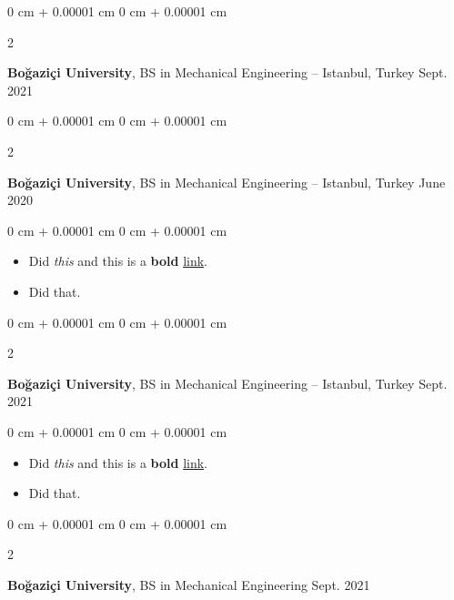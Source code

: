 \documentclass[10pt, letterpaper]{article}
\newenvironment{highlights}{
    \begin{itemize}[
        topsep=0.10 cm,
        parsep=0.10 cm,
        partopsep=0pt,
        itemsep=0pt,
        leftmargin=0 cm + 10pt
    ]
}{
    \end{itemize}
} %
\newenvironment{onecolentry}{
    \begin{adjustwidth}{
        0 cm + 0.00001 cm
    }{
        0 cm + 0.00001 cm
    }
}{
    \end{adjustwidth}
} %
\newenvironment{twocolentry}[2][]{
    \onecolentry
    \def\secondColumn{#2}
    \setcolumnwidth{\fill, 4.5 cm}
    \begin{paracol}{2}
}{
    \switchcolumn \raggedleft \secondColumn
    \end{paracol}
    \endonecolentry
} %
\begin{document}
        \vspace{0.2 cm}

        \begin{twocolentry}{
            Sept. 2021
        }
            \textbf{Boğaziçi University}, BS in Mechanical Engineering -- Istanbul, Turkey\end{twocolentry}



        \vspace{0.2 cm}

        \begin{twocolentry}{
            June 2020
        }
            \textbf{Boğaziçi University}, BS in Mechanical Engineering -- Istanbul, Turkey\end{twocolentry}

        \vspace{0.10 cm}
        \begin{onecolentry}
            \begin{highlights}
                \item Did \textit{this} and this is a \textbf{bold} \href{https://example.com}{link}.
                \item Did that.
            \end{highlights}
        \end{onecolentry}


        \vspace{0.2 cm}

        \begin{twocolentry}{
            Sept. 2021
        }
            \textbf{Boğaziçi University}, BS in Mechanical Engineering -- Istanbul, Turkey\end{twocolentry}

        \vspace{0.10 cm}
        \begin{onecolentry}
            \begin{highlights}
                \item Did \textit{this} and this is a \textbf{bold} \href{https://example.com}{link}.
                \item Did that.
            \end{highlights}
        \end{onecolentry}


        \vspace{0.2 cm}

        \begin{twocolentry}{
            Sept. 2021
        }
            \textbf{Boğaziçi University}, BS in Mechanical Engineering\end{twocolentry}
\end{document}

